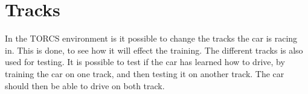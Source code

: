 \section{Tracks}
In the TORCS environment is it possible to change the tracks the car is racing in. This is done, to see how it will effect the training. The different tracks is also used for testing. It is possible to test if the car has learned how to drive, by training the car on one track, and then testing it on another track. The car should then be able to drive on both track.  